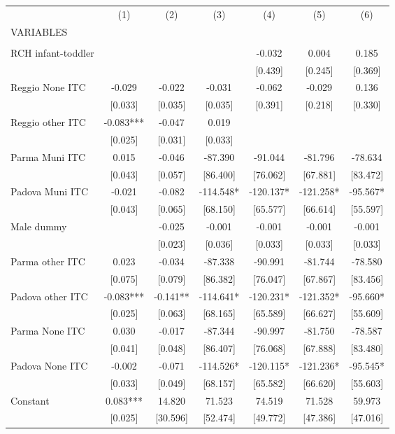 \begin{tabular}{lcccccc} \hline
 & (1) & (2) & (3) & (4) & (5) & (6) \\
VARIABLES &  &  &  &  &  &  \\ \hline
 &  &  &  &  &  &  \\
RCH infant-toddler &  &  &  & -0.032 & 0.004 & 0.185 \\
 &  &  &  & [0.439] & [0.245] & [0.369] \\
Reggio None ITC & -0.029 & -0.022 & -0.031 & -0.062 & -0.029 & 0.136 \\
 & [0.033] & [0.035] & [0.035] & [0.391] & [0.218] & [0.330] \\
Reggio other ITC & -0.083*** & -0.047 & 0.019 &  &  &  \\
 & [0.025] & [0.031] & [0.033] &  &  &  \\
Parma Muni ITC & 0.015 & -0.046 & -87.390 & -91.044 & -81.796 & -78.634 \\
 & [0.043] & [0.057] & [86.400] & [76.062] & [67.881] & [83.472] \\
Padova Muni ITC & -0.021 & -0.082 & -114.548* & -120.137* & -121.258* & -95.567* \\
 & [0.043] & [0.065] & [68.150] & [65.577] & [66.614] & [55.597] \\
Male dummy &  & -0.025 & -0.001 & -0.001 & -0.001 & -0.001 \\
 &  & [0.023] & [0.036] & [0.033] & [0.033] & [0.033] \\
Parma other ITC & 0.023 & -0.034 & -87.338 & -90.991 & -81.744 & -78.580 \\
 & [0.075] & [0.079] & [86.382] & [76.047] & [67.867] & [83.456] \\
Padova other ITC & -0.083*** & -0.141** & -114.641* & -120.231* & -121.352* & -95.660* \\
 & [0.025] & [0.063] & [68.165] & [65.589] & [66.627] & [55.609] \\
Parma None ITC & 0.030 & -0.017 & -87.344 & -90.997 & -81.750 & -78.587 \\
 & [0.041] & [0.048] & [86.407] & [76.068] & [67.888] & [83.480] \\
Padova None ITC & -0.002 & -0.071 & -114.526* & -120.115* & -121.236* & -95.545* \\
 & [0.033] & [0.049] & [68.157] & [65.582] & [66.620] & [55.603] \\
Constant & 0.083*** & 14.820 & 71.523 & 74.519 & 71.528 & 59.973 \\
 & [0.025] & [30.596] & [52.474] & [49.772] & [47.386] & [47.016] \\

\end{tabular}
